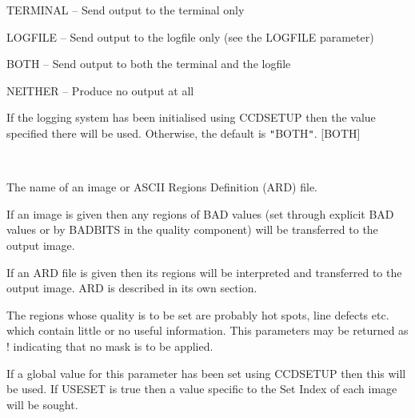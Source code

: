 \documentclass[twoside,11pt]{article}
\newcommand{\htmlref}[2]{#1}
\renewcommand{\_}{\texttt{\symbol{95}}}
\newcommand{\qt}[1]{{\tt "}#1{\tt "}}
\newcommand{\routine}[1]{{\sc #1}}
\newcommand{\xroutine}[1]{\htmlref{{\sc #1}}{#1}}
\newcommand{\sstsubsection}[1]{ \item[{#1}] \mbox{} \\}
\newcommand{\sstitem}{\item}
\newcommand{\sstsubsection}[1]{\item[{#1}]}
\newcommand{\sstitem}{\item}
\begin{document}
{{{{            \sstitem
               TERMINAL  -- Send output to the terminal only

            \sstitem
               LOGFILE   -- Send output to the logfile only (see the
                               LOGFILE parameter)

            \sstitem
               BOTH      -- Send output to both the terminal and the
                               logfile

            \sstitem
               NEITHER   -- Produce no output at all

         }
         If the logging system has been initialised using \xroutine{CCDSETUP}
         then the value specified there will be used. Otherwise, the
         default is \qt{BOTH}.
         [BOTH]
      }
      \sstsubsection{
         MASK = LITERAL (Read)
      } {
         The name of an image or ASCII Regions Definition (ARD) file.

         If an image is given then any regions of BAD values (set through
         explicit BAD values or by BADBITS in the quality component)
         will be transferred to the output image.

         If an ARD file is given then its regions will be interpreted
         and transferred to the output image. ARD is described in its own
         section.

         The regions whose quality is to be set are probably hot spots,
         line defects etc.  which contain little or no useful
         information. This parameters may be returned as ! indicating
         that no mask is to be applied.

         If a global value for this parameter has been set using
         \routine{CCDSETUP} then this will be used.  If USESET is true then a
         value specific to the Set Index of each image will be sought.

}}}
\end{document}
